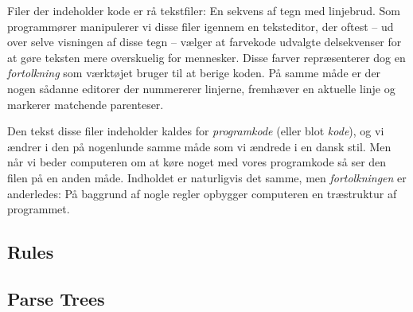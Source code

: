 Filer der indeholder kode er rå tekstfiler: En sekvens af tegn med linjebrud. Som programmører manipulerer vi disse filer igennem en teksteditor, der oftest -- ud over selve visningen af disse tegn -- vælger at farvekode udvalgte delsekvenser for at gøre teksten mere overskuelig for mennesker. Disse farver repræsenterer dog en \textsl{fortolkning} som værktøjet bruger til at berige koden. På samme måde er der nogen sådanne editorer der nummererer linjerne, fremhæver en aktuelle linje og markerer matchende parenteser.

Den tekst disse filer indeholder kaldes for \textsl{programkode} (eller blot \textsl{kode}), og vi ændrer i den på nogenlunde samme måde som vi ændrede i en dansk stil. Men når vi beder computeren om at køre noget med vores programkode så ser den filen på en anden måde. Indholdet er naturligvis det samme, men \textsl{fortolkningen} er anderledes: På baggrund af nogle regler opbygger computeren en træstruktur af programmet.


\subsection{Rules}


\subsection{Parse Trees}

